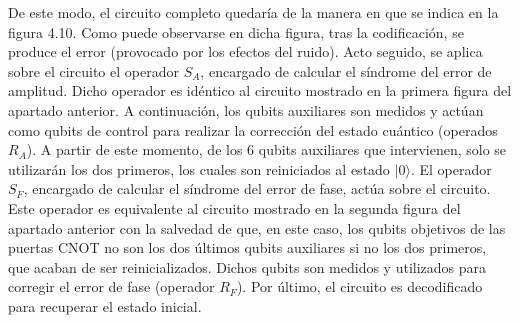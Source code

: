 De este modo, el circuito completo quedaría de la manera en que se indica en la  figura 4.10. Como puede observarse en dicha figura, tras la codificación, se produce el error (provocado por los efectos del ruido). Acto seguido, se aplica sobre el circuito el operador $S_A$, encargado de calcular el síndrome del error de amplitud. Dicho operador es idéntico al circuito mostrado en la primera figura del apartado anterior. A continuación, los qubits auxiliares son medidos y actúan como qubits de control para realizar la corrección del estado cuántico (operados $R_A$). A partir de este momento, de los 6 qubits auxiliares que intervienen, solo se utilizarán los dos primeros, los cuales son reiniciados al estado $ | 0 \rangle $. El operador $S_F$, encargado de calcular el síndrome del error de fase, actúa sobre el circuito. Este operador es equivalente al circuito mostrado en la segunda figura del apartado anterior con la salvedad de que, en este caso, los qubits objetivos de las puertas CNOT no son los dos últimos qubits auxiliares si no los dos primeros, que acaban de ser reinicializados. Dichos qubits son medidos y utilizados para corregir el error de fase (operador $R_F$). Por último, el circuito es decodificado para recuperar el estado inicial. 


